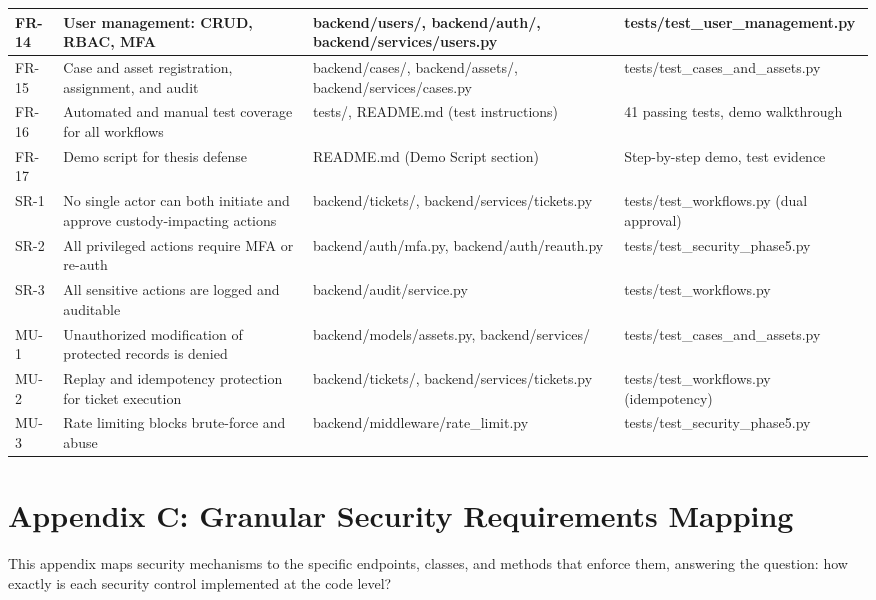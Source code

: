 \documentclass[12pt,a4paper]{report}
\begin{document}
\begin{longtable}{|p{1.2cm}|p{4.5cm}|p{5cm}|p{4.3cm}|}
\hline
FR-14 & User management: CRUD, RBAC, MFA & backend/users/, backend/auth/, backend/services/users.py & tests/test\_user\_management.py \\
\hline
FR-15 & Case and asset registration, assignment, and audit & backend/cases/, backend/assets/, backend/services/cases.py & tests/test\_cases\_and\_assets.py \\
\hline
FR-16 & Automated and manual test coverage for all workflows & tests/, README.md (test instructions) & 41 passing tests, demo walkthrough \\
\hline
FR-17 & Demo script for thesis defense & README.md (Demo Script section) & Step-by-step demo, test evidence \\
\hline
SR-1 & No single actor can both initiate and approve custody-impacting actions & backend/tickets/, backend/services/tickets.py & tests/test\_workflows.py (dual approval) \\
\hline
SR-2 & All privileged actions require MFA or re-auth & backend/auth/mfa.py, backend/auth/reauth.py & tests/test\_security\_phase5.py \\
\hline
SR-3 & All sensitive actions are logged and auditable & backend/audit/service.py & tests/test\_workflows.py \\
\hline
MU-1 & Unauthorized modification of protected records is denied & backend/models/assets.py, backend/services/ & tests/test\_cases\_and\_assets.py \\
\hline
MU-2 & Replay and idempotency protection for ticket execution & backend/tickets/, backend/services/tickets.py & tests/test\_workflows.py (idempotency) \\
\hline
MU-3 & Rate limiting blocks brute-force and abuse & backend/middleware/rate\_limit.py & tests/test\_security\_phase5.py \\
\hline
\end{longtable}

\chapter*{Appendix C: Granular Security Requirements Mapping}

This appendix maps security mechanisms to the specific endpoints, classes, and methods that enforce them, answering the question: how exactly is each security control implemented at the code level?
\end{document}
